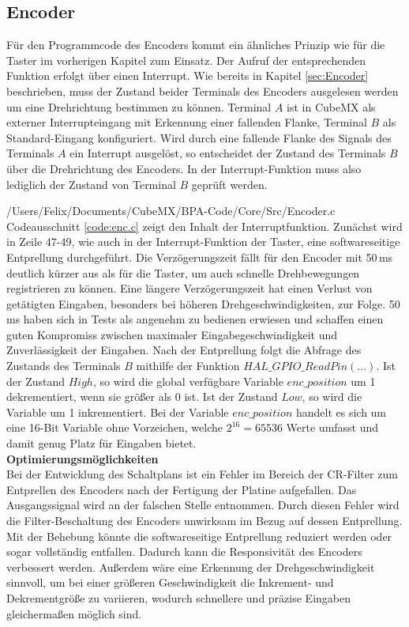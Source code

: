 
\subsection{Encoder}
Für den Programmcode des Encoders kommt ein ähnliches Prinzip wie für die Taster im vorherigen Kapitel zum Einsatz. Der Aufruf der entsprechenden Funktion erfolgt über einen Interrupt.
Wie bereits in Kapitel \ref{sec:Encoder} beschrieben, muss der Zustand beider Terminals des Encoders ausgelesen werden um eine Drehrichtung bestimmen zu können. Terminal $A$ ist in CubeMX als externer Interrupteingang mit Erkennung einer fallenden Flanke, Terminal $B$ als Standard-Eingang konfiguriert. Wird durch eine fallende Flanke des Signals des Terminals $A$ ein Interrupt ausgelöst, so entscheidet der Zustand des Terminals $B$ über die Drehrichtung des Encoders. In der Interrupt-Funktion muss also lediglich der Zustand von Terminal $B$ geprüft werden. 

{/Users/Felix/Documents/CubeMX/BPA-Code/Core/Src/Encoder.c}
Codeausschnitt \ref{code:enc.c} zeigt den Inhalt der Interruptfunktion. Zunächst wird in Zeile 47-49, wie auch in der Interrupt-Funktion der Taster, eine softwareseitige Entprellung durchgeführt. Die Verzögerungszeit fällt für den Encoder mit 50\,ms deutlich kürzer aus als für die Taster, um auch schnelle Drehbewegungen registrieren zu können. Eine längere Verzögerungszeit hat einen Verlust von getätigten Eingaben, besonders bei höheren Drehgeschwindigkeiten, zur Folge. 50\,ms haben sich in Tests als angenehm zu bedienen erwiesen und schaffen einen guten Kompromiss zwischen maximaler Eingabegeschwindigkeit und Zuverlässigkeit der Eingaben.
Nach der Entprellung folgt die Abfrage des Zustands des Terminals $B$ mithilfe der Funktion $HAL\_GPIO\_ReadPin(...)$. Ist der Zustand $High$, so wird die global verfügbare Variable $enc\_position$ um 1 dekrementiert, wenn sie größer als 0 ist. Ist der Zustand $Low$, so wird die Variable um 1 inkrementiert. Bei der Variable $enc\_position$ handelt es sich um eine 16-Bit Variable ohne Vorzeichen, welche $2^{16} = 65536$ Werte umfasst und damit genug Platz für Eingaben bietet.\\
\textbf{Optimierungsmöglichkeiten}\\
Bei der Entwicklung des Schaltplans ist ein Fehler im Bereich der CR-Filter zum Entprellen des Encoders nach der Fertigung der Platine aufgefallen. Das Ausgangssignal wird an der falschen Stelle entnommen. Durch diesen Fehler wird die Filter-Beschaltung des Encoders unwirksam im Bezug auf dessen Entprellung. Mit der Behebung könnte die softwareseitige Entprellung reduziert werden oder sogar vollständig entfallen. Dadurch kann die Responsivität des Encoders verbessert werden.
Außerdem wäre eine Erkennung der Drehgeschwindigkeit sinnvoll, um bei einer größeren Geschwindigkeit die Inkrement- und Dekrementgröße zu variieren, wodurch schnellere und präzise Eingaben gleichermaßen möglich sind.